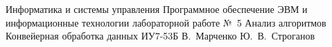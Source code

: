 \makereporttitle
    {Информатика и системы управления}
    {Программное обеспечение ЭВМ и информационные технологии}
    {лабораторной работе №~5}
    {Анализ алгоритмов}
    {Конвейерная обработка данных}
    {}
    {ИУ7-53Б}
    {В.~Марченко}
    {Ю.~В.~Строганов}
    {}
